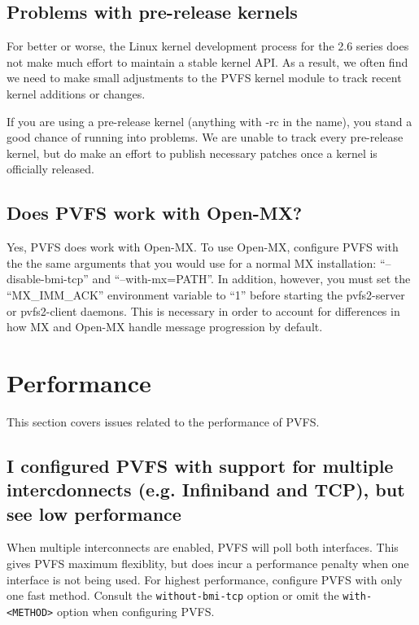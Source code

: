 \documentclass[11pt,letterpaper]{article}
\begin{document}
\subsection{Problems with pre-release kernels}
\label{sec:rc-kernels}

For better or worse, the Linux kernel development process for the 2.6 series
does not make much effort to maintain a stable kernel API.  As a result, we
often find we need to make small adjustments to the PVFS kernel module to track
recent kernel additions or changes.  

If you are using a pre-release kernel (anything with -rc in the name), you
stand a good chance of running into problems.  We are unable to track every
pre-release kernel, but do make an effort to publish necessary patches once a
kernel is officially released. 

\subsection{Does PVFS work with Open-MX?}
\label{sec:open-mx}

Yes, PVFS does work with Open-MX.  To use Open-MX, configure PVFS with
the the same arguments that you would use for a normal MX installation:
``--disable-bmi-tcp'' and ``--with-mx=PATH''.  In addition, however, you
must set the ``MX\_IMM\_ACK'' environment variable to ``1'' before starting
the pvfs2-server or pvfs2-client daemons.  This is necessary in order to
account for differences in how MX and Open-MX handle message progression by
default.

%
%
\section{Performance}

This section covers issues related to the performance of PVFS.

\subsection{I configured PVFS with support for multiple intercdonnects (e.g. Infiniband and TCP), but see low performance}
\label{sec:multi-method-badperf}

When multiple interconnects are enabled, PVFS will poll both interfaces.  This
gives PVFS maximum flexiblity, but does incur a performance penalty when one
interface is not being used.  For highest performance, configure PVFS with only
one fast method.  Consult the \texttt{without-bmi-tcp} option or omit the
\texttt{with-<METHOD>} option when configuring PVFS.  
\end{document}
